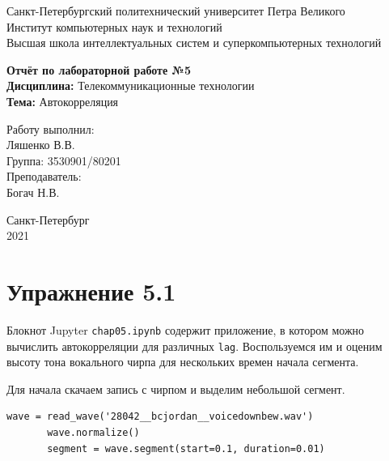 \documentclass[a4paper,12pt]{report}
\begin{document}
 

\begin{titlepage}
\newpage
	\begin{center}
		\large Санкт-Петербургский политехнический университет Петра Великого\\
		Институт компьютерных наук и технологий\\
		Высшая школа интеллектуальных систем и суперкомпьютерных технологий\\
	\end{center}
\vspace{7cm}

\begin{center}
		\large \textbf{Отчёт по лабораторной работе №5} \\
		\textbf{Дисциплина:} Телекоммуникационные технологии\\
		\textbf{Тема:} Автокорреляция
\end{center}
\vspace{4cm}
	
\begin{flushright}
		\large Работу выполнил:\\ Ляшенко В.В.\\
		Группа: 3530901/80201\\
		Преподаватель:\\ Богач Н.В.
\end{flushright}

\vspace{\fill}
\begin{center}
	\large Санкт-Петербург\\ 2021
	\end{center}
\end{titlepage}

\tableofcontents
\listoffigures
\lstlistoflistings

\chapter{Упражнение 5.1}
    Блокнот Jupyter \texttt{chap05.ipynb} содержит приложение, в котором можно вычислить автокорреляции для различных \texttt{lag}. Воспользуемся им и оценим высоту тона вокального чирпа для нескольких времен начала сегмента. 
    
    Для начала скачаем запись с чирпом и выделим небольшой сегмент.
\begin{lstlisting}[caption=Получение сегмента]
       wave = read_wave('28042__bcjordan__voicedownbew.wav')
       wave.normalize()
       segment = wave.segment(start=0.1, duration=0.01)
\end{lstlisting} 
\end{document}
